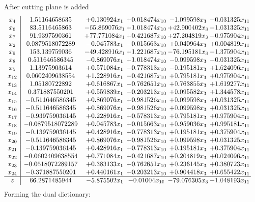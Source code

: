 \documentclass[11pt]{article}
\begin{document}
 After cutting plane is added 
\[\begin{array}{c| c c@{\hskip 2pt} c@{\hskip 2pt} c@{\hskip 2pt} c@{\hskip 2pt} }
 x_{4}   &  1.51164658635 & + 0.130924 x_{1} & + 0.018474 x_{10} & -1.099598 x_{3} & -0.031325 x_{11}\\
 x_{6}   &  83.5116465863 & -65.869076 x_{1} & + 1.018474 x_{10} & + 42.900402 x_{3} & -1.031325 x_{11}\\
 x_{7}   &  91.9397590361 & + 77.771084 x_{1} & + 0.421687 x_{10} & + 27.204819 x_{3} & -0.975904 x_{11}\\
 x_{2}   &  0.0879518072289 & -0.045783 x_{1} & -0.015663 x_{10} & + 0.040964 x_{3} & + 0.004819 x_{11}\\
 x_{9}   &  153.139759036 & -49.428916 x_{1} & + 1.221687 x_{10} & -76.195181 x_{3} & -1.375904 x_{11}\\
 x_{8}   &  0.511646586345 & -0.869076 x_{1} & + 1.018474 x_{10} & -0.099598 x_{3} & -0.031325 x_{11}\\
 x_{5}   &  1.13975903614 & + 0.571084 x_{1} & -0.778313 x_{10} & -0.195181 x_{3} & + 1.624096 x_{11}\\
 x_{12}   &  0.0602409638554 & + 1.228916 x_{1} & -0.421687 x_{10} & + 0.795181 x_{3} & + 0.975904 x_{11}\\
 x_{13}   &  1.05180722892 & + 0.616867 x_{1} & -0.762651 x_{10} & + 0.763855 x_{3} & + 1.619277 x_{11}\\
 x_{14}   &  0.371887550201 & + 0.559839 x_{1} & -0.203213 x_{10} & + 0.095582 x_{3} & + 1.344578 x_{11}\\
 x_{15}   &  -0.511646586345 & + 0.869076 x_{1} & + 0.981526 x_{10} & + 0.099598 x_{3} & + 0.031325 x_{11}\\
 x_{16}   &  -0.511646586345 & + 0.869076 x_{1} & + 0.981526 x_{10} & + 0.099598 x_{3} & + 0.031325 x_{11}\\
 x_{17}   &  -0.939759036145 & + 0.228916 x_{1} & + 0.578313 x_{10} & + 0.795181 x_{3} & + 0.975904 x_{11}\\
 x_{18}   &  -0.0879518072289 & + 0.045783 x_{1} & + 0.015663 x_{10} & + 0.959036 x_{3} & + 0.995181 x_{11}\\
 x_{19}   &  -0.139759036145 & + 0.428916 x_{1} & + 0.778313 x_{10} & + 0.195181 x_{3} & + 0.375904 x_{11}\\
 x_{20}   &  -0.511646586345 & + 0.869076 x_{1} & + 0.981526 x_{10} & + 0.099598 x_{3} & + 0.031325 x_{11}\\
 x_{21}   &  -0.139759036145 & + 0.428916 x_{1} & + 0.778313 x_{10} & + 0.195181 x_{3} & + 0.375904 x_{11}\\
 x_{22}   &  -0.0602409638554 & + 0.771084 x_{1} & + 0.421687 x_{10} & + 0.204819 x_{3} & + 0.024096 x_{11}\\
 x_{23}   &  -0.0518072289157 & + 0.383133 x_{1} & + 0.762651 x_{10} & + 0.236145 x_{3} & + 0.380723 x_{11}\\
 x_{24}   &  -0.371887550201 & + 0.440161 x_{1} & + 0.203213 x_{10} & + 0.904418 x_{3} & + 0.655422 x_{11}\\
\hline
z    &  66.2871485944 & -5.875502 x_{1} & -0.01004 x_{10} & -79.076305 x_{3} & -1.048193 x_{11}\\
\end{array}\]
Forming the dual dictionary:
\end{document}
